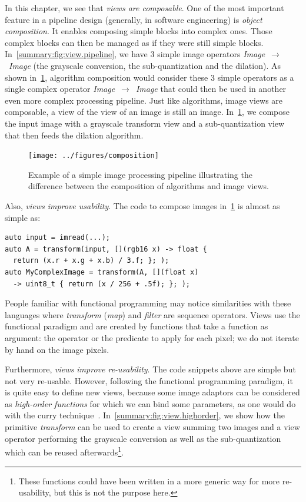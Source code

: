 In this chapter, we see that \emph{views are composable}. One of the most important feature in a pipeline design
(generally, in software engineering) is \emph{object composition}. It enables composing simple blocks into complex ones.
Those complex blocks can then be managed as if they were still simple blocks. In~\cref{summary:fig:view.pipeline}, we
have 3 simple image operators \emph{Image}~\(\rightarrow\)~\emph{Image} (the grayscale conversion, the sub-quantization
and the dilation). As shown in~\cref{summary:fig:view.comp}, algorithm composition would consider these 3 simple
operators as a single complex operator \emph{Image}~\(\rightarrow\)~\emph{Image} that could then be used in another even
more complex processing pipeline. Just like algorithms, image views are composable, \eg a view of the view of an image
is still an image. In~\cref{summary:fig:view.comp}, we compose the input image with a grayscale transform view and a
sub-quantization view that then feeds the dilation algorithm.

\begin{figure}[htbp]
  \centering
  \texttt{[image: ../figures/composition]}
  \caption[]{Example of a simple image processing pipeline illustrating the difference between the composition of
    algorithms and image views.}
  \label{summary:fig:view.comp}
\end{figure}

Also, \emph{views improve usability}. The code to compose images in~\cref{summary:fig:view.comp} is almost as simple as:

\begin{verbatim}
auto input = imread(...);
auto A = transform(input, [](rgb16 x) -> float {
  return (x.r + x.g + x.b) / 3.f; }; );
auto MyComplexImage = transform(A, [](float x)
  -> uint8_t { return (x / 256 + .5f); }; );
\end{verbatim}

People familiar with functional programming may notice similarities with these languages where \emph{transform}
(\emph{map}) and \emph{filter} are sequence operators. Views use the functional paradigm and are created by functions
that take a function as argument: the operator or the predicate to apply for each pixel; we do not iterate by hand on
the image pixels.

Furthermore, \emph{views improve re-usability}. The code snippets above are simple but not very re-usable. However,
following the functional programming paradigm, it is quite easy to define new views, because some image adaptors can be
considered as \emph{high-order functions} for which we can bind some parameters, as one would do with the curry
technique~\parencite{hanus.1995.curry}. In~\cref{summary:fig:view.highorder}, we show how the primitive \emph{transform}
can be used to create a view summing two images and a view operator performing the grayscale conversion as well as the
sub-quantization which can be reused afterwards\footnote{These functions could have been written in a more generic way
  for more re-usability, but this is not the purpose here.}.

